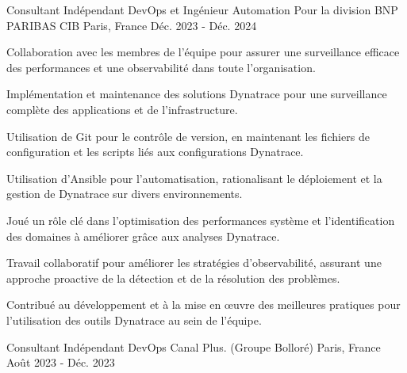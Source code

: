 

\begin{cventries}

  \cventry
    {Consultant Indépendant DevOps et Ingénieur Automation} %
    {Pour la division BNP PARIBAS CIB} %
    {Paris, France} %
    {Déc. 2023 - Déc. 2024} %
    {
      \begin{cvitems} %
        \item {Collaboration avec les membres de l'équipe pour assurer une surveillance efficace des performances et une observabilité dans toute l'organisation.}
        \item {Implémentation et maintenance des solutions Dynatrace pour une surveillance complète des applications et de l'infrastructure.}
        \item {Utilisation de Git pour le contrôle de version, en maintenant les fichiers de configuration et les scripts liés aux configurations Dynatrace.}
        \item {Utilisation d'Ansible pour l'automatisation, rationalisant le déploiement et la gestion de Dynatrace sur divers environnements.}
        \item {Joué un rôle clé dans l'optimisation des performances système et l'identification des domaines à améliorer grâce aux analyses Dynatrace.}
        \item {Travail collaboratif pour améliorer les stratégies d'observabilité, assurant une approche proactive de la détection et de la résolution des problèmes.}
        \item {Contribué au développement et à la mise en œuvre des meilleures pratiques pour l'utilisation des outils Dynatrace au sein de l'équipe.}
      \end{cvitems}
  \cventry
    {Consultant Indépendant DevOps} %
    {Canal Plus. (Groupe Bolloré)} %
    {Paris, France} %
    {Août 2023 - Déc. 2023} %
    {
      \begin{cvitems} %

\end{cvitems}}}
\end{cventries}

